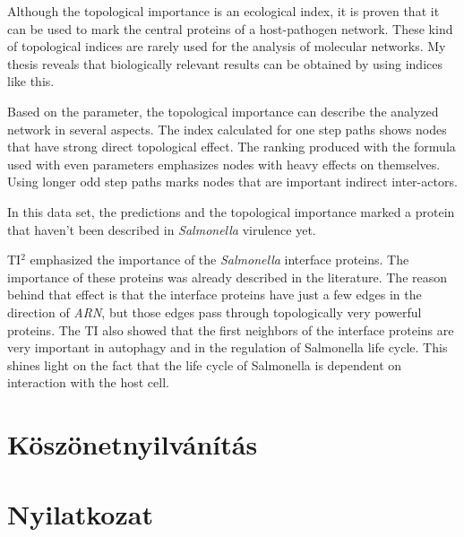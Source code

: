 \documentclass[a4paper,12pt]{article}
\begin{document}
		Although the topological importance is an ecological index, it is proven that it can be used to mark the central proteins of a host-pathogen network. These kind of topological indices are rarely used for the analysis of molecular networks. My thesis reveals that biologically relevant results can be obtained by using indices like this. 
		
		Based on the parameter, the topological importance can describe the analyzed network in several aspects. The index calculated for one step paths shows nodes that have strong direct topological effect. The ranking produced with the formula used with even parameters emphasizes nodes with heavy effects on themselves. Using longer odd step paths marks nodes that are important  indirect inter-actors.
		
		In this data set, the predictions and the topological importance marked a protein that haven't been described in \textit{Salmonella} virulence yet.

		TI$^2$ emphasized the importance of the \textit{Salmonella} interface proteins. The importance of these proteins was already described in the literature. The reason behind that effect is that the interface proteins have just a few edges in the direction of \textit{ARN}, but those edges pass through topologically very powerful proteins. The TI also showed that the first neighbors of the interface proteins are very important in autophagy and in the regulation of Salmonella life cycle. This shines light on the fact that the life cycle of Salmonella is dependent on interaction with the host cell. 
				
		\pagebreak

\section{Köszönetnyilvánítás}

\section{Nyilatkozat}

\pagebreak


{}

\end{document}
